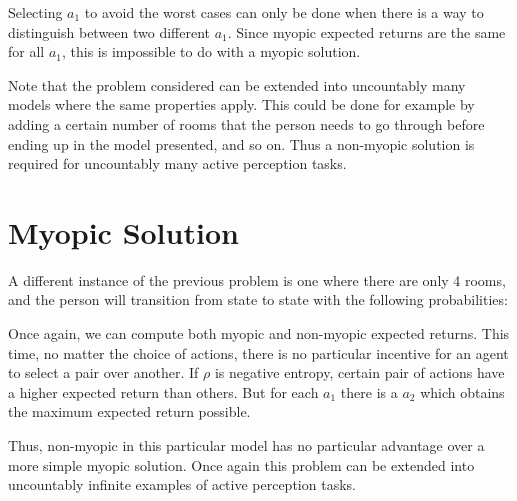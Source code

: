 Selecting $a_1$ to avoid the worst cases can only be done when there is a way to distinguish between
two different $a_1$.  Since myopic expected returns are the same for all $a_1$, this is impossible
to do with a myopic solution.

Note that the problem considered can be extended into uncountably many models where the same
properties apply. This could be done for example by adding a certain number of rooms that the person
needs to go through before ending up in the model presented, and so on. Thus a non-myopic solution
is required for uncountably many active perception tasks.

\section{Myopic Solution}

A different instance of the previous problem is one where there are only 4 rooms, and the person
will transition from state to state with the following probabilities:

\begin{center}
\end{center}

Once again, we can compute both myopic and non-myopic expected returns. This time, no matter the
choice of actions, there is no particular incentive for an agent to select a pair over another. If
$\rho$ is negative entropy, certain pair of actions have a higher expected return than others. But
for each $a_1$ there is a $a_2$ which obtains the maximum expected return possible.

Thus, non-myopic in this particular model has no particular advantage over a more simple myopic
solution. Once again this problem can be extended into uncountably infinite examples of active
perception tasks.

